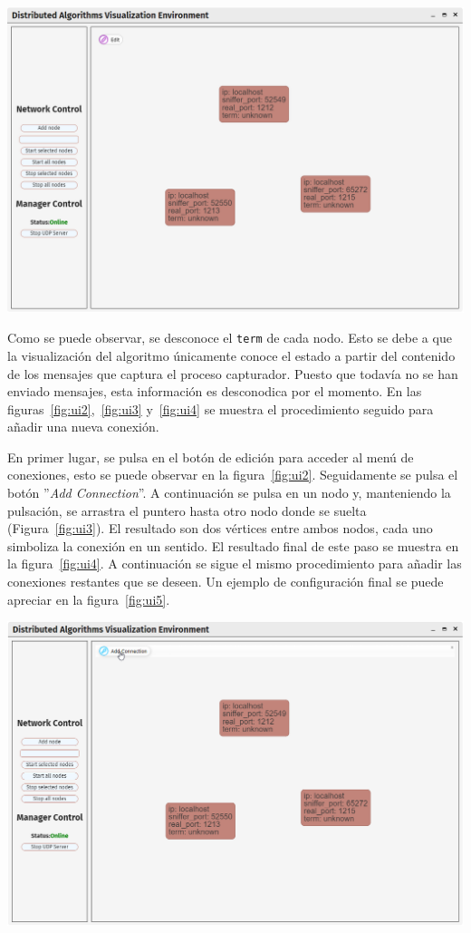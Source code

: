 {
\centering
\includegraphics[width=0.9\linewidth]{imagenes/ui1}
\label{fig:ui1}
}

Como se puede observar, se desconoce el \texttt{term} de cada nodo. Esto se debe a que la visualización del algoritmo únicamente conoce el estado a partir del contenido de los mensajes que captura el proceso capturador. Puesto que todavía no se han enviado mensajes, esta información es desconodica por el momento. En las figuras~\ref{fig:ui2},~\ref{fig:ui3} y~\ref{fig:ui4} se muestra el procedimiento seguido para añadir una nueva conexión.

En primer lugar, se pulsa en el botón de edición para acceder al menú de conexiones, esto se puede observar en la figura~\ref{fig:ui2}. Seguidamente se pulsa el botón ''\textit{Add Connection}''. A continuación se pulsa en un nodo y, manteniendo la pulsación, se arrastra el puntero hasta otro nodo donde se suelta (Figura~\ref{fig:ui3}). El resultado son dos vértices entre ambos nodos, cada uno simboliza la conexión en un sentido. El resultado final de este paso se muestra en la figura~\ref{fig:ui4}. A continuación se sigue el mismo procedimiento para añadir las conexiones restantes que se deseen. Un ejemplo de configuración final se puede apreciar en la figura~\ref{fig:ui5}.

{
\centering
\includegraphics[width=0.9\linewidth]{imagenes/ui2}
\label{fig:ui2}
}

